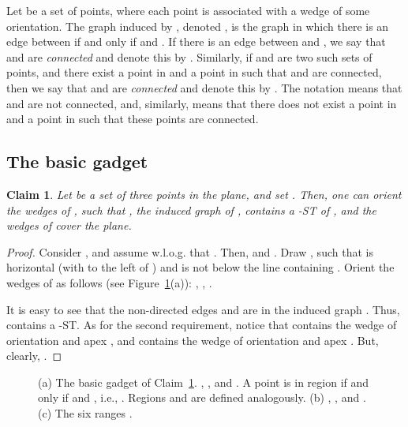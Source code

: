 \documentclass[11pt]{article}
\newtheorem{claim}[theorem]{Claim}
\begin{document}
Let  be a set of points, where each point  is associated with a wedge  of some orientation.
The graph induced by , denoted , is the graph in which there is an edge between  if and only if  and . If there is an edge between  and , we say that  and  are {\em connected} and denote this by . Similarly, if  and  are two such sets of points, and there exist a point  in  and a point  in  such that  and  are connected, then we say that  and  are {\em connected} and denote this by . The notation  means that  and  are not connected, and, similarly,  means that there does not exist a point in  and a point in  such that these points are connected.

\subsection{The basic gadget}\label{sec:orient}

\begin{claim}\label{lem:three_pts}
Let  be a set of three points in the plane, and set . Then, one can orient the wedges
of , such that , the induced graph of , contains a -ST of , and the wedges of  cover
the plane.
\end{claim}

\begin{proof}
Consider , and
assume w.l.o.g. that . Then,  and . Draw , such that  is horizontal (with  to the left of ) and  is not below the line containing .
Orient the wedges of  as follows (see Figure~\ref{fig:three_pts_fig}(a)): 
,
,
. 

It is easy to see that the non-directed edges  and  are in the induced graph .
Thus,  contains a -ST. As for the second requirement, notice that 
 contains the wedge  of orientation  and apex , and
 contains the wedge  of orientation  and apex . But, clearly,
.  
\end{proof}



\begin{figure}[htb]
\centering
 	\caption{(a) The basic gadget of Claim~\ref{lem:three_pts}. , , and . A point  is in region  if and only if  and , i.e., . Regions  and  are defined analogously. (b) , , and . (c) The six ranges .}	\label{fig:three_pts_fig}	
\end{figure} 
\end{document}
